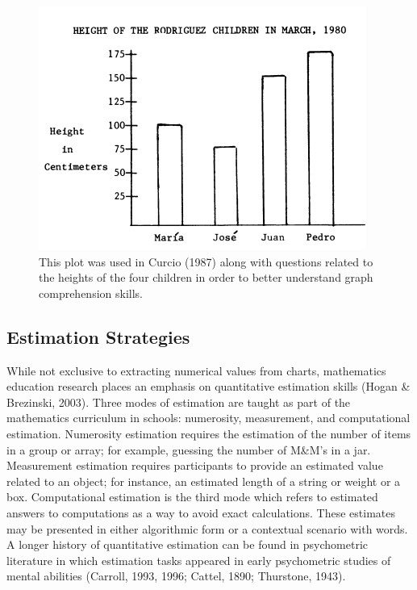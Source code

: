 \documentclass[print]{nuthesis}
\begin{document}
\begin{figure}[tbp]

{\centering \includegraphics[width=0.8\linewidth,]{images/children-height} 

}

\caption[Comprehension of heights, Curcio (1987)]{This plot was used in Curcio (1987) along with questions related to the heights of the four children in order to better understand graph comprehension skills.}\label{fig:children-height}
\end{figure}

\hypertarget{estimation-strategies}{%
\subsection{Estimation Strategies}\label{estimation-strategies}}

While not exclusive to extracting numerical values from charts, mathematics education research places an emphasis on quantitative estimation skills (Hogan \& Brezinski, 2003).
Three modes of estimation are taught as part of the mathematics curriculum in schools: numerosity, measurement, and computational estimation.
Numerosity estimation requires the estimation of the number of items in a group or array; for example, guessing the number of M\&M's in a jar.
Measurement estimation requires participants to provide an estimated value related to an object; for instance, an estimated length of a string or weight or a box.
Computational estimation is the third mode which refers to estimated answers to computations as a way to avoid exact calculations.
These estimates may be presented in either algorithmic form or a contextual scenario with words.
A longer history of quantitative estimation can be found in psychometric literature in which estimation tasks appeared in early psychometric studies of mental abilities (Carroll, 1993, 1996; Cattel, 1890; Thurstone, 1943).
\end{document}
